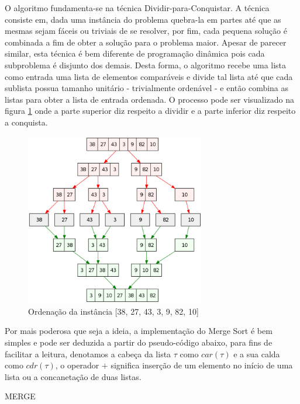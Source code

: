 \documentclass[12pt]{article}
\theoremstyle{definition}
\begin{document}
O algoritmo fundamenta-se na técnica Dividir-para-Conquistar. A técnica consiste em, dada uma instância do problema
quebra-la em partes até que as mesmas sejam fáceis ou triviais de se resolver, por fim, cada pequena solução é combinada a fim
de obter a solução para o problema maior. Apesar de parecer similar, esta técnica é bem diferente de programação dinâmica pois
cada subproblema é disjunto dos demais. Desta forma, o algoritmo recebe uma lista como entrada uma lista de elementos comparáveis
e divide tal lista até que cada sublista possua tamanho unitário - trivialmente ordenável - e então combina as listas para obter
a lista de entrada ordenada. O processo pode ser visualizado na figura \ref{fig:merge_sort_example} onde a parte superior diz respeito
a dividir e a parte inferior diz respeito a conquista.

\begin{figure}[h]
        \centering
        \includegraphics[width=0.7\textwidth]{figures/merge.png}
        \caption{Ordenação da instância [38, 27, 43, 3, 9, 82, 10]}
        \label{fig:merge_sort_example}
\end{figure}

Por mais poderosa que seja a ideia, a implementação do Merge Sort é bem simples e pode ser deduzida a partir do pseudo-código abaixo, 
para fins de facilitar a leitura, denotamos a cabeça da lista $\tau$ como $car(\tau)$ e a sua calda como $cdr(\tau)$, o operador $+$
significa inserção de um elemento no início de uma lista ou a concanetação de duas listas. 

\begin{algorithm}[H]
        \caption{MERGE}
\end{algorithm}
\end{document}
